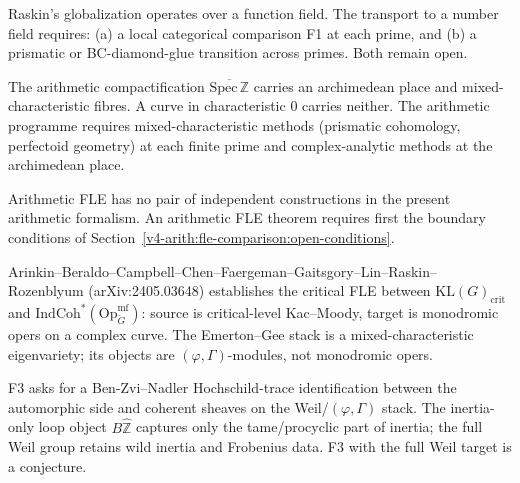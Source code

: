 \begin{remark}
\label{v4-arith:fle-comparison:rem:function-field-transport}
Raskin's globalization operates over a function field. The transport
to a number field requires: (a) a local categorical comparison F1 at
each prime, and (b) a prismatic or BC-diamond-glue transition across
primes. Both remain open.
\end{remark}

\begin{remark}
\label{v4-arith:fle-comparison:rem:mixed-char-substrate}
The arithmetic compactification
\(\overline{\mathrm{Spec}\,\mathbb{Z}}\) carries an archimedean place
and mixed-characteristic fibres. A curve in characteristic \(0\)
carries neither. The arithmetic programme requires mixed-characteristic
methods (prismatic cohomology, perfectoid geometry) at each finite
prime and complex-analytic methods at the archimedean place.
\end{remark}

\begin{remark}
\label{v4-arith:fle-comparison:rem:hz-iv-form}
Arithmetic FLE has no pair of independent constructions in
the present arithmetic formalism. An arithmetic FLE theorem requires first
the boundary conditions of
Section~\ref{v4-arith:fle-comparison:open-conditions}.
\end{remark}

\begin{remark}
\label{v4-arith:fle-comparison:rem:agkrrv-target}
Arinkin--Beraldo--Campbell--Chen--Faergeman--Gaitsgory--Lin--Raskin--%
Rozenblyum (arXiv:2405.03648) establishes the critical FLE between
\(\mathrm{KL}(G)_{\mathrm{crit}}\) and
\(\mathrm{IndCoh}^{*}(\mathrm{Op}^{\mathrm{mf}}_{\check G})\): source
is critical-level Kac--Moody, target is monodromic opers on a complex
curve. The Emerton--Gee stack is a mixed-characteristic eigenvariety;
its objects are \((\varphi,\Gamma)\)-modules, not monodromic opers.
\end{remark}

\begin{remark}
\label{v4-arith:fle-comparison:rem:f3-bzn}
F3 asks for a Ben-Zvi--Nadler Hochschild-trace identification between
the automorphic side and coherent sheaves on the Weil/\((\varphi,\Gamma)\)
stack. The inertia-only loop object
\(B\widehat{\mathbb{Z}}\) captures only the tame/procyclic part of
inertia; the full Weil group retains wild inertia and Frobenius data.
F3 with the full Weil target is a conjecture.
\end{remark}

